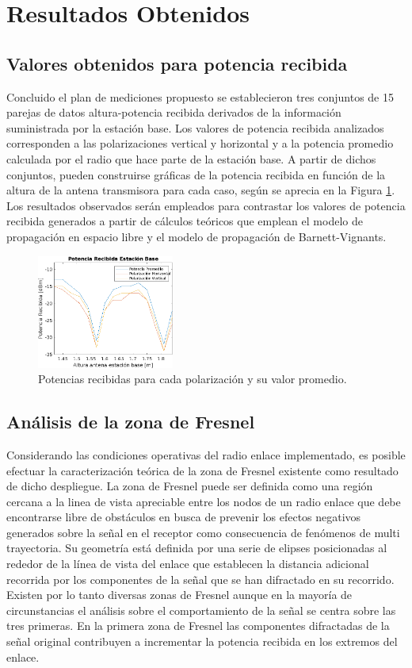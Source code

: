 \documentclass[conference]{IEEEtran}
\begin{document}
\section{Resultados Obtenidos}
\subsection{Valores obtenidos para potencia recibida}
Concluido el plan de mediciones propuesto se establecieron tres conjuntos de 15 parejas de datos altura-potencia recibida derivados de la información suministrada
por la estación base. Los valores de potencia recibida analizados corresponden a las polarizaciones vertical y horizontal y a la potencia
promedio calculada por el radio que hace parte de la estación base. A partir de dichos conjuntos, pueden construirse gráficas de la potencia recibida en función de la 
altura de la antena transmisora para cada caso, según se aprecia en la Figura \ref{fig:Potencias}. Los resultados observados serán empleados para contrastar los valores de potencia 
recibida generados a partir de cálculos teóricos que emplean el modelo de propagación en espacio libre y el modelo de propagación de Barnett-Vignants.
\begin{figure}
    \centering
          \includegraphics[width=0.4\textwidth]{Potencias.png}
        \caption{Potencias recibidas para cada polarización y su valor promedio.
        }
        \label{fig:Potencias}
\end{figure}
\subsection{Análisis de la zona de Fresnel}
Considerando las condiciones operativas del radio enlace implementado, es posible efectuar la caracterización teórica de la 
zona de Fresnel existente como resultado de dicho despliegue. La zona de Fresnel puede ser definida como una región cercana a la 
linea de vista apreciable entre los nodos de un radio enlace que debe encontrarse libre de obstáculos en busca de prevenir los efectos negativos
generados sobre la señal en el receptor como consecuencia de fenómenos de multi trayectoria. Su geometría está definida por una serie de elipses 
posicionadas al rededor de la línea de vista del enlace que establecen la distancia adicional recorrida por los componentes de la señal
que se han difractado en su recorrido. Existen por lo tanto diversas zonas de Fresnel aunque en la mayoría de circunstancias el análisis 
sobre el comportamiento de la señal se centra sobre las tres primeras.  En la primera zona de Fresnel las componentes difractadas de la señal
original contribuyen a incrementar la potencia recibida en los extremos del enlace. 
\end{document}
